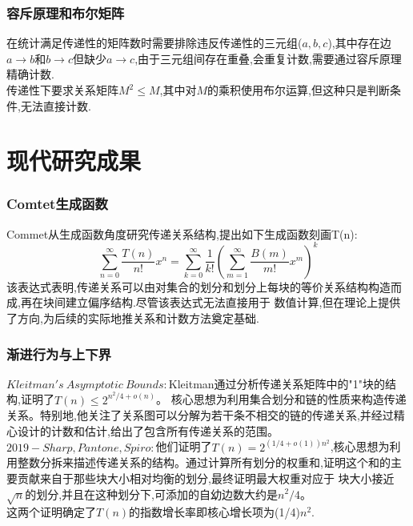 \documentclass[12pt]{article}
\theoremstyle{definition}
\begin{document}
\subsubsection{容斥原理和布尔矩阵}
在统计满足传递性的矩阵数时需要排除违反传递性的三元组($a,b,c$),其中存在边$a\rightarrow b$和$b \rightarrow c$但缺少$a \rightarrow c$,由于三元组间存在重叠,会重复计数,需要通过容斥原理精确计数.\\
\hspace*{2em}传递性下要求关系矩阵$M^2$$\leq$$M$,其中对$M$的乘积使用布尔运算,但这种只是判断条件,无法直接计数.
\section{现代研究成果}
\subsubsection{Comtet生成函数}\cite{comtet}
Commet从生成函数角度研究传递关系结构,提出如下生成函数刻画T(n):
\[
\sum_{n=0}^{\infty}\frac{T(n)}{n!}x^{n}=\sum_{k=0}^{\infty}\frac{1}{k!}(\sum_{m=1}^{\infty}\frac{B(m)}{m!}x^{m})^{k}
\]
\hspace*{2em}该表达式表明,传递关系可以由对集合的划分和划分上每块的等价关系结构构造而成,再在块间建立偏序结构.尽管该表达式无法直接用于
数值计算,但在理论上提供了方向,为后续的实际地推关系和计数方法奠定基础.
\subsubsection{渐进行为与上下界}\cite{maarefparvarnumber}
$Kleitman's\ Asymptotic\ Bounds:$Kleitman通过分析传递关系矩阵中的"1"块的结构,证明了$T(n)\leq 2^{n^2/4+o(n)}$。
核心思想为利用集合划分和链的性质来构造传递关系。特别地,他关注了关系图可以分解为若干条不相交的链的传递关系,并经过精心设计的计数和估计,给出了包含所有传递关系的范围。\\
\hspace*{2em}$2019-Sharp,Pantone,Spiro:$他们证明了$T(n)=2^{(1/4+o(1))n^2}$,核心思想为利用整数分拆来描述传递关系的结构。通过计算所有划分的权重和,证明这个和的主要贡献来自于那些块大小相对均衡的划分,最终证明最大权重对应于
块大小接近$\sqrt{n}$的划分,并且在这种划分下,可添加的自幼边数大约是$n^{2}/4$。\\
\hspace*{2em}这两个证明确定了$T(n)$的指数增长率即核心增长项为(1/4)$n^2$.
\end{document}
